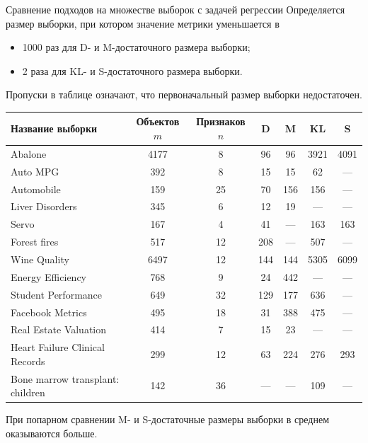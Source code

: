 \documentclass{beamer}
\begin{document}
\begin{frame}{Сравнение подходов на множестве выборок с задачей регрессии}
    \vspace{-0.2cm}
    Определяется размер выборки, при котором значение метрики уменьшается в 
    \vspace{-0.1cm}
    \begin{itemize}
        \item 1000 раз для D- и M-достаточного размера выборки;
        \item 2 раза для KL- и S-достаточного размера выборки.
    \end{itemize}
    Пропуски в таблице означают, что первоначальный размер выборки недостаточен.
    
    \tiny
    \begin{table}
        \begin{tabular}{lcc|cc|cc}
        \toprule
        Название выборки & Объектов $m$ & Признаков $n$ & D & M & KL & S \\
        \midrule
        Abalone & 4177 & 8 & 96 & 96 & 3921 & 4091 \\
        Auto MPG & 392 & 8 & 15 & 15 & 62 & --- \\
        Automobile & 159 & 25 & 70 & 156 & 156 & --- \\
        Liver Disorders & 345 & 6 & 12 & 19 & --- & --- \\
        Servo & 167 & 4 & 41 & --- & 163 & 163 \\
        Forest fires & 517 & 12 & 208 & --- & 507 & --- \\
        Wine Quality & 6497 & 12 & 144 & 144 & 5305 & 6099 \\
        Energy Efficiency & 768 & 9 & 24 & 442 & --- & --- \\
        Student Performance & 649 & 32 & 129 & 177 & 636 & --- \\
        Facebook Metrics & 495 & 18 & 31 & 388 & 475 & ---  \\
        Real Estate Valuation & 414 & 7 & 15 & 23 & --- & --- \\
        Heart Failure Clinical Records & 299 & 12 & 63 & 224 & 276 & 293 \\
        Bone marrow transplant: children & 142 & 36 & --- & --- & 109 & --- \\
        \bottomrule
        \end{tabular}
    \end{table}
    
    \normalsize При попарном сравнении M- и S-достаточные размеры выборки в среднем оказываются больше.
\end{frame}
\end{document}
